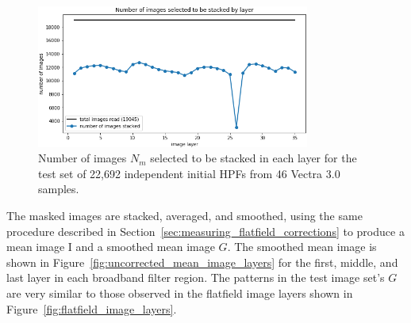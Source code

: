 \documentclass[letterpaper,11pt]{article}
\newcommand{\reffig}[1]{Figure~\ref{#1}}
\newcommand{\refsec}[1]{Section~\ref{#1}}
\newcommand{\Iota}{\mathrm{I}}
\begin{document}
\begin{figure}[!ht]
\centering
\includegraphics[width=0.80\textwidth]{images/results/n_images_stacked_per_layer_test_set}
\caption{\footnotesize Number of images $N_{m}$ selected to be stacked in each layer for the test set of 22,692 independent initial HPFs from 46 Vectra 3.0 samples.}
\label{fig:test_set_n_images_stacked}
\end{figure} 

The masked images are stacked, averaged, and smoothed, using the same procedure described in \refsec{sec:measuring_flatfield_corrections} to produce a mean image $\Iota$ and a smoothed mean image $G$. The smoothed mean image is shown in \reffig{fig:uncorrected_mean_image_layers} for the first, middle, and last layer in each broadband filter region. The patterns in the test image set's $G$ are very similar to those observed in the flatfield image layers shown in \reffig{fig:flatfield_image_layers}. 
\end{document}
